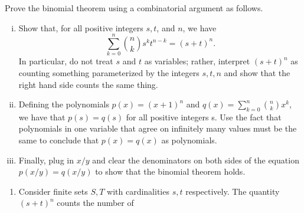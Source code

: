 \documentclass[12pt]{memoir}
\begin{document}
\begin{Ej}[Exercise 2]
Prove the binomial theorem using a combinatorial argument as follows.
\begin{enumerate}[i)]
    \itemsep=-0.4em
    \item Show that, for all positive integers $s, t$, and $n$, we have
    $$\sum_{k=0}^n\binom{n}{k}s^kt^{n-k}=(s+t)^n.$$
    In particular, do not treat $s$ and $t$ as variables; rather, interpret $(s+t)^n$ as counting something
    parameterized by the integers $s, t, n$ and show that the right hand side counts the same thing.
    \item Defining the polynomials $p(x) = (x + 1)^n$ and $q(x) = \sum_{k=0}^n\binom{n}{k}x^k$, we have that $p(s) = q(s)$
    for all positive integers s. Use the fact that polynomials in one variable that agree on infinitely many
    values must be the same to conclude that $p(x) = q(x)$ as polynomials.
    \item Finally, plug in $x/y$ and clear the denominators on both sides of the equation $p(x/y) = q(x/y)$ to show that the binomial theorem holds.
\end{enumerate}
\end{Ej}

\begin{ptcbr}
    \begin{enumerate}
        \itemsep=-0.4em
        \item 
        Consider finite sets $S,T$ with cardinalities $s,t$ respectively. The quantity $(s+t)^n$ counts the number of 
    \end{enumerate}
\end{ptcbr}
\end{document}
